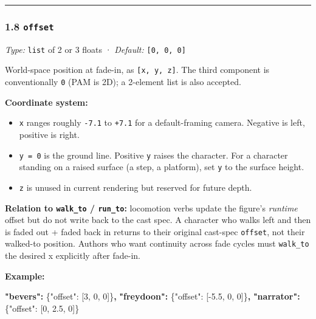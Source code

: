 \documentclass[
  11pt,
]{book}
\newenvironment{Shaded}{}{}
\newcommand{\DataTypeTok}[1]{\textcolor[rgb]{0.56,0.13,0.00}{#1}}
\newcommand{\DecValTok}[1]{\textcolor[rgb]{0.25,0.63,0.44}{#1}}
\newcommand{\ErrorTok}[1]{\textcolor[rgb]{1.00,0.00,0.00}{\textbf{#1}}}
\newcommand{\FloatTok}[1]{\textcolor[rgb]{0.25,0.63,0.44}{#1}}
\newcommand{\FunctionTok}[1]{\textcolor[rgb]{0.02,0.16,0.49}{#1}}
\newcommand{\OtherTok}[1]{\textcolor[rgb]{0.00,0.44,0.13}{#1}}
\providecommand{\tightlist}{%
  \setlength{\itemsep}{0pt}\setlength{\parskip}{0pt}}
\begin{document}
\begin{center}\rule{0.5\linewidth}{0.5pt}\end{center}

\subsubsection{\texorpdfstring{1.8
\texttt{offset}}{1.8 offset}}\label{offset}

\emph{Type:} \texttt{list} of 2 or 3 floats · \emph{Default:}
\texttt{{[}0,\ 0,\ 0{]}}

World-space position at fade-in, as \texttt{{[}x,\ y,\ z{]}}. The third
component is conventionally \texttt{0} (PAM is 2D); a 2-element list is
also accepted.

\textbf{Coordinate system:}

\begin{itemize}
\tightlist
\item
  \texttt{x} ranges roughly \texttt{-7.1} to \texttt{+7.1} for a
  default-framing camera. Negative is left, positive is right.
\item
  \texttt{y\ =\ 0} is the ground line. Positive \texttt{y} raises the
  character. For a character standing on a raised surface (a step, a
  platform), set \texttt{y} to the surface height.
\item
  \texttt{z} is unused in current rendering but reserved for future
  depth.
\end{itemize}

\textbf{Relation to \texttt{walk\_to} / \texttt{run\_to}:} locomotion
verbs update the figure's \emph{runtime} offset but do not write back to
the cast spec. A character who walks left and then is faded out + faded
back in returns to their original cast-spec \texttt{offset}, not their
walked-to position. Authors who want continuity across fade cycles must
\texttt{walk\_to} the desired x explicitly after fade-in.

\textbf{Example:}

\begin{Shaded}
\begin{Highlighting}[]
\ErrorTok{"bevers":}  \FunctionTok{\{}\DataTypeTok{"offset"}\FunctionTok{:} \OtherTok{[}\DecValTok{3}\OtherTok{,} \DecValTok{0}\OtherTok{,} \DecValTok{0}\OtherTok{]}\FunctionTok{\}}\ErrorTok{,}
\ErrorTok{"freydoon":} \FunctionTok{\{}\DataTypeTok{"offset"}\FunctionTok{:} \OtherTok{[}\FloatTok{{-}5.5}\OtherTok{,} \DecValTok{0}\OtherTok{,} \DecValTok{0}\OtherTok{]}\FunctionTok{\}}\ErrorTok{,}
\ErrorTok{"narrator":} \FunctionTok{\{}\DataTypeTok{"offset"}\FunctionTok{:} \OtherTok{[}\DecValTok{0}\OtherTok{,} \FloatTok{2.5}\OtherTok{,} \DecValTok{0}\OtherTok{]}\FunctionTok{\}}
\end{Highlighting}
\end{Shaded}
\end{document}
